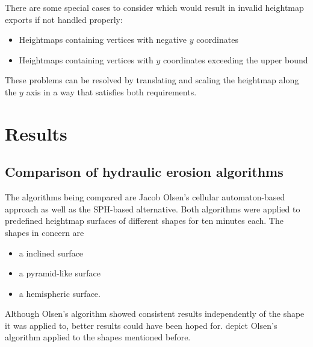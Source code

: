 \documentclass[11pt,a4paper,twoside,openright]{report}
\begin{document}
\noindent There are some special cases to consider which would result in invalid heightmap exports if not handled properly:
\begin{itemize}
  \item Heightmaps containing vertices with negative $y$ coordinates
  \item Heightmaps containing vertices with $y$ coordinates exceeding the upper bound
\end{itemize}
These problems can be resolved by translating and scaling the heightmap along the $y$ axis in a way that satisfies both requirements.

\chapter{Results}
\label{sec:results}

\section{Comparison of hydraulic erosion algorithms}
The algorithms being compared are Jacob Olsen's cellular automaton-based approach as well as the SPH-based alternative. Both algorithms were applied to predefined heightmap surfaces of different shapes for ten minutes each. The shapes in concern are
\begin{itemize}
\item a inclined surface
\item a pyramid-like surface
\item a hemispheric surface.
\end{itemize}
Although Olsen's algorithm showed consistent results independently of the shape it was applied to, better results could have been hoped for.  depict Olsen's algorithm applied to the shapes mentioned before.
\end{document}
